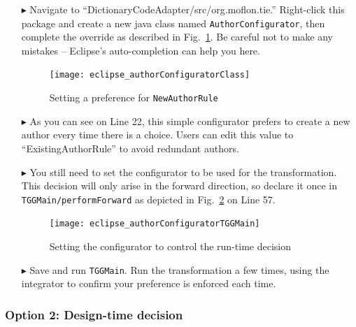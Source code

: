 \begin{itemize}

\item[$\blacktriangleright$] Navigate to ``DictionaryCodeAdapter/src/org.moflon.tie.'' Right-click this package and create a new java class named
\texttt{Author\-Config\-ur\-at\-or}, then complete the override as described in Fig.~\ref{eclipse:authorConfig}. Be careful not to make any mistakes --
Eclipse's auto-completion can help you here.

\begin{figure}[htbp]
  \texttt{[image: eclipse\_authorConfiguratorClass]}
  \caption{Setting a preference for \texttt{NewAuthorRule}}
  \label{eclipse:authorConfig}
\end{figure}

\item[$\blacktriangleright$] As you can see on Line 22, this simple configurator prefers to create a new author every time there is a choice. Users can
edit this value to ``ExistingAuthorRule'' to avoid redundant authors.

\item[$\blacktriangleright$] You still need to set the configurator to be used for the transformation. This decision will only arise in the forward
direction, so declare it once in \texttt{TGGMain/performForward} as depicted in Fig.~\ref{eclipse:editTGGMain} on Line 57.

\newpage

\vspace*{0.5cm}

\begin{figure}[htbp]
\begin{center}
  \texttt{[image: eclipse\_authorConfiguratorTGGMain]}
  \caption{Setting the configurator to control the run-time decision}
  \label{eclipse:editTGGMain}
\end{center}
\end{figure}

\item[$\blacktriangleright$] Save and run \texttt{TGGMain}. Run the transformation a few times, using the integrator to confirm your preference is enforced each
time.

\end{itemize}

\subsubsection{Option 2: Design-time decision}

